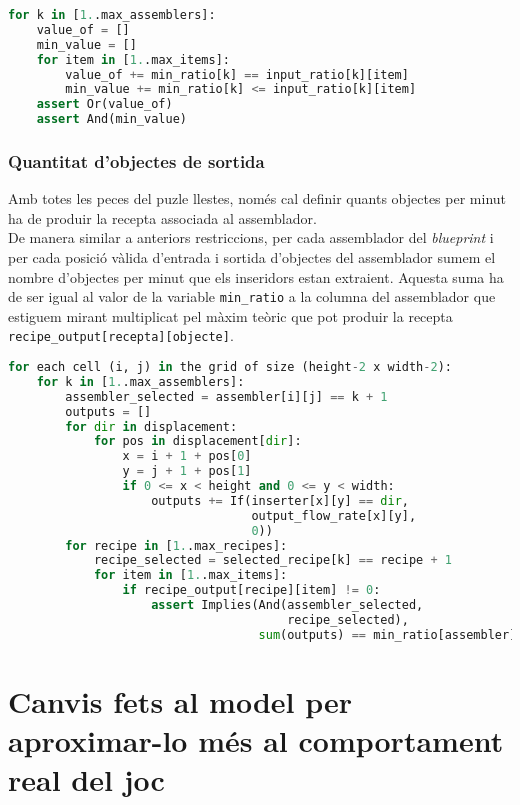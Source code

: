 \begin{lstlisting}[language=Python, caption=Min Ratio]
for k in [1..max_assemblers]:
    value_of = []
    min_value = []
    for item in [1..max_items]:
        value_of += min_ratio[k] == input_ratio[k][item]
        min_value += min_ratio[k] <= input_ratio[k][item]
    assert Or(value_of)
    assert And(min_value)
\end{lstlisting}

\subsubsection{Quantitat d'objectes de sortida}
Amb totes les peces del puzle llestes, només cal definir quants objectes per minut ha de produir la recepta associada al assemblador.\\
De manera similar a anteriors restriccions, per cada assemblador del \textit{blueprint} i per cada posició vàlida d'entrada i sortida d'objectes del assemblador sumem el nombre d'objectes per minut que els inseridors estan extraient. Aquesta suma ha de ser igual al valor de la variable \texttt{min\_ratio} a la columna del assemblador que estiguem mirant multiplicat pel màxim teòric que pot produir la recepta \texttt{recipe\_output[recepta][objecte]}.

\begin{lstlisting}[language=Python, caption=Min Ratio]
for each cell (i, j) in the grid of size (height-2 x width-2):
    for k in [1..max_assemblers]:
        assembler_selected = assembler[i][j] == k + 1
        outputs = []
        for dir in displacement:
            for pos in displacement[dir]:
                x = i + 1 + pos[0]
                y = j + 1 + pos[1]
                if 0 <= x < height and 0 <= y < width:
                    outputs += If(inserter[x][y] == dir,
                                  output_flow_rate[x][y],
                                  0))
        for recipe in [1..max_recipes]:
            recipe_selected = selected_recipe[k] == recipe + 1
            for item in [1..max_items]:
                if recipe_output[recipe][item] != 0:
                    assert Implies(And(assembler_selected,
                                       recipe_selected),
                                   sum(outputs) == min_ratio[assembler] * recipe_output[recipe][item])
\end{lstlisting}


\section{Canvis fets al model per aproximar-lo més al comportament real del joc}\label{mecanics-changes}

